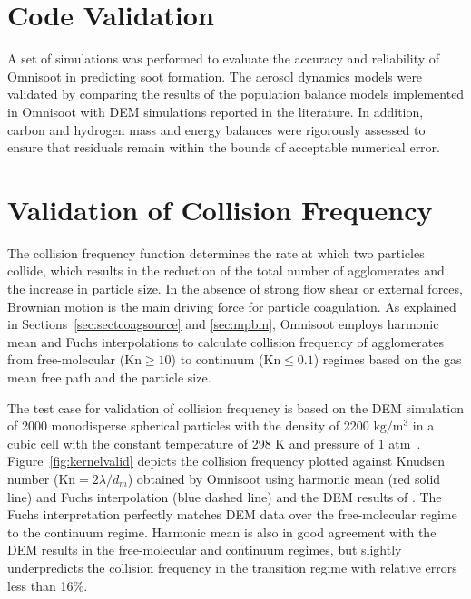 \section{Code Validation}
A set of simulations was performed to evaluate the accuracy and reliability of Omnisoot in predicting soot formation. The aerosol dynamics models were validated by comparing the results of the population balance models implemented in Omnisoot with DEM simulations reported in the literature. In addition, carbon and hydrogen mass and energy balances were rigorously assessed to ensure that residuals remain within the bounds of acceptable numerical error.


\section{Validation of Collision Frequency}
\label{sec:validcolfreq}
The collision frequency function determines the rate at which two particles collide, which results in the reduction of the total number of agglomerates and the increase in particle size. In the absence of strong flow shear or external forces, Brownian motion is the main driving force for particle coagulation. As explained in Sections~\ref{sec:sectcoagsource} and \ref{sec:mpbm}, Omnisoot employs harmonic mean and Fuchs interpolations to calculate collision frequency of agglomerates from free-molecular ($\mathrm{Kn}\ge10$) to continuum ($\mathrm{Kn}\le0.1$) regimes based on the gas mean free path and the particle size. 


The test case for validation of collision frequency is based on the DEM simulation of 2000 monodisperse spherical particles with the density of 2200 $\mathrm{kg/m^3}$ in
a cubic cell with the constant temperature of 298 K and pressure of 1 atm~\citep{goudeli2015coagulation}. Figure~\ref{fig:kernelvalid} depicts the collision frequency plotted against Knudsen number ($\mathrm{Kn}=2\lambda/d_m$) obtained by Omnisoot using harmonic mean (red solid line) and Fuchs interpolation (blue dashed line) and the DEM results of \citet{goudeli2015coagulation}. The Fuchs interpretation perfectly matches DEM data over the free-molecular regime to the continuum regime. Harmonic mean is also in good agreement with the DEM results in the free-molecular and continuum regimes, but slightly underpredicts the collision frequency in the transition regime with relative errors less than 16\%.

